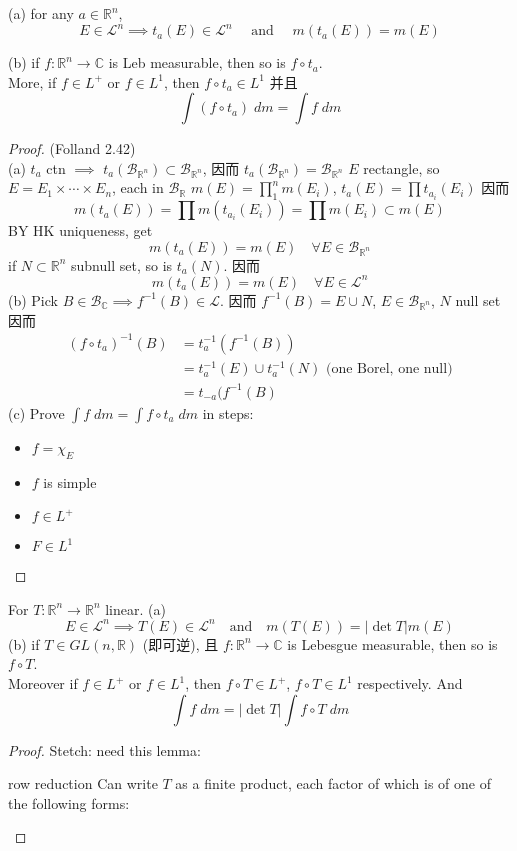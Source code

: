 \documentclass[lang=cn,11pt]{elegantbook}
\begin{document}
\begin{theorem}
(a) for any $a \in \mathbb{R}^n$, 
\[
E \in \mathcal{L}^n \implies  t_a(E) \in \mathcal{L}^n \quad \text{ and }\quad m(t_a(E)) = m(E)
\]

(b) if $f: \mathbb{R}^n \to \mathbb{C}$ is Leb measurable, then so is $f \circ t_a$. \\
More, if $f \in L^+$ or $f \in L^1$, then $f \circ t_a \in L^1$ 并且  \[
\int (f \circ t_a) \; dm = \int f \; dm
\]
\end{theorem}
\begin{proof}
    (Folland 2.42)\\
    (a)
    $t_a $ ctn $\implies$ $t_a(\mathcal{B}_{\mathbb{R}^n}) \subset \mathcal{B}_{\mathbb{R}^n}$, 因而  $t_a(\mathcal{B}_{\mathbb{R}^n})=\mathcal{B}_{\mathbb{R}^n}$
    $E$ rectangle, so $E = E_1 \times \cdots \times E_n $, each in $\mathcal{B}_\mathbb{R}$
    $m(E) = \prod_1^n m(E_i)$, $t_a(E) = \prod t_{a_i} (E_i)$ 
    因而  \[
    m(t_a(E)) = \prod m(t_{a_i} (E_i)) = \prod m(E_i) \subset m(E)
    \]
    BY HK uniqueness, get \[
    m(t_a(E)) = m(E) \quad \forall E \in \mathcal{B}_{\mathbb{R}^n}
    \]
    if $N \subset \mathbb{R}^n$ subnull set, so is $t_a(N)$. 因而 \[
    m(t_a(E)) = m(E) \quad \forall E \in \mathcal{L}^n 
    \]
    (b) Pick $B \in \mathcal{B}_\mathbb{C} \implies f^{-1}(B) \in \mathcal{L}$.
    因而 $f^{-1}(B) = E \cup N$, $E \in \mathcal{B}_{\mathbb{R}^n}$, $N$ null set
    因而 \begin{align}
        (f\circ t_a)^{-1}(B) & = t_a^{-1}( f^{-1}(B)) \\&= t_a^{-1}(E) \cup t_a^{-1}(N) \text{ (one Borel, one null)} \\
        &= t_{-a}(f^{-1}(B)
    \end{align}
(c) Prove $\int f \; dm = \int f \circ t_a \;d m$ in steps: \begin{itemize}
    \item $f = \chi_E$
    \item $f$ is simple 
    \item $f \in L^+$
    \item $F \in L^1$
\end{itemize}    
\end{proof}





\begin{theorem}
For $T: \mathbb{R}^n \to \mathbb{R}^n$ linear. 
(a) \[ E \in \mathcal{L}^n  \implies T(E) \in \mathcal{L}^n  \quad \text{and}\quad    m(T(E)) = |\det T| m(E)  \]
(b) if $T \in GL(n,\mathbb{R})$ (即可逆), 且 $f: \mathbb{R}^n \to \mathbb{C}$ is Lebesgue measurable, then so is $f \circ T$.\\
Moreover if $f \in L^+$ or $f \in L^1$, then $f \circ T \in L^+$, $f \circ T \in L^1$ respectively. And \[
  \int f \; dm = |\det T| \int f \circ T \; dm
\]
\end{theorem}

\begin{proof}
    Stetch: need this lemma: \begin{lemma}{row reduction}
        Can write $T$ as a finite product, each factor of which is of one of the following forms: 
    \end{lemma}
\end{proof}
\end{document}
